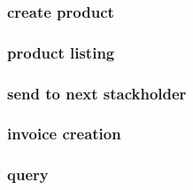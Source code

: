 \subsubsection{create product}

\subsubsection{product listing}

\subsubsection{send to next stackholder}

\subsubsection{invoice creation}

\subsubsection{query}









